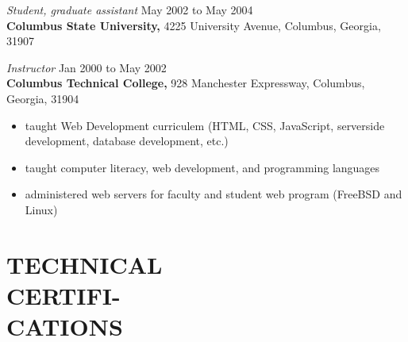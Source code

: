 \documentclass[margin, 10pt]{res} %
\begin{document}
\begin{resume}
{\it Student, graduate assistant} \hfill May 2002 to May 2004 \\
\textbf{Columbus State University,} 4225 University Avenue, Columbus, Georgia, 31907


{\it Instructor} \hfill Jan 2000 to May 2002 \\
\textbf{Columbus Technical College,} 928 Manchester Expressway, Columbus, Georgia, 31904

\begin{itemize} \itemsep -2pt %
        \item taught Web Development curriculem (HTML, CSS, JavaScript, serverside development, database development, etc.)
\item taught computer literacy, web development, and programming languages
\item administered web servers for faculty and student web program (FreeBSD and Linux)
\end{itemize}


\section{TECHNICAL\\CERTIFI-\\CATIONS\\
}


\end{resume}
\end{document}
